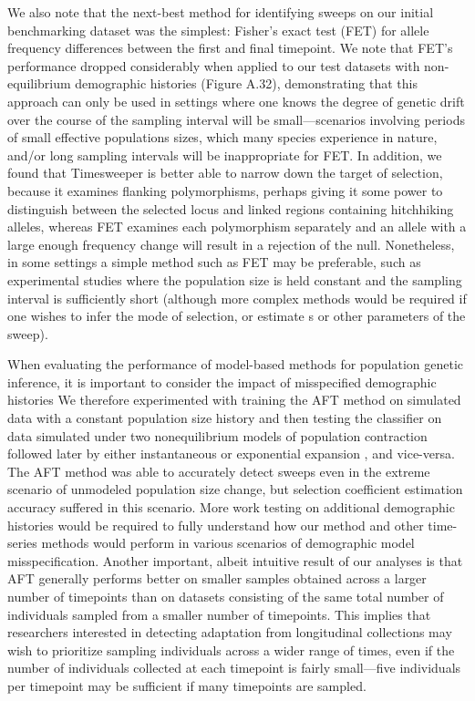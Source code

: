 We also note that the next-best method for identifying sweeps on our initial benchmarking dataset was the simplest: Fisher’s exact test (FET) for allele frequency differences between the first and final timepoint. We note that FET’s performance dropped considerably when applied to our test datasets with non-equilibrium demographic histories (Figure A.32), demonstrating that this approach can only be used in settings where one knows the degree of genetic drift over the course of the sampling interval will be small—scenarios involving periods of small effective populations sizes, which many species experience in nature, and/or long sampling intervals will be inappropriate for FET. In addition, we found that Timesweeper is better able to narrow down the target of selection, because it examines flanking polymorphisms, perhaps giving it some power to distinguish between the selected locus and linked regions containing hitchhiking alleles, whereas FET examines each polymorphism separately and an allele with a large enough frequency change will result in a rejection of the null. Nonetheless, in some settings a simple method such as FET may be preferable, such as experimental studies where the population size is held constant and the sampling interval is sufficiently short (although more complex methods would be required if one wishes to infer the mode of selection, or estimate s or other parameters of the sweep).

When evaluating the performance of model-based methods for population genetic inference, it is important to consider the impact of misspecified demographic histories \cite{moDomainadaptiveNeuralNetworks2023a,schriderHICRobustIdentification2016} We therefore experimented with training the AFT method on simulated data with a constant population size history and then testing the classifier on data simulated under two nonequilibrium models of population contraction followed later by either instantaneous or exponential expansion \cite{gutenkunstInferringJointDemographic2009,marthAlleleFrequencySpectrum2004}, and vice-versa. The AFT method was able to accurately detect sweeps even in the extreme scenario of unmodeled population size change, but selection coefficient estimation accuracy suffered in this scenario. More work testing on additional demographic histories would be required to fully understand how our method and other time-series methods would perform in various scenarios of demographic model misspecification. Another important, albeit intuitive result of our analyses is that AFT generally performs better on smaller samples obtained across a larger number of timepoints than on datasets consisting of the same total number of individuals sampled from a smaller number of timepoints. This implies that researchers interested in detecting adaptation from longitudinal collections may wish to prioritize sampling individuals across a wider range of times, even if the number of individuals collected at each timepoint is fairly small—five individuals per timepoint may be sufficient if many timepoints are sampled.

